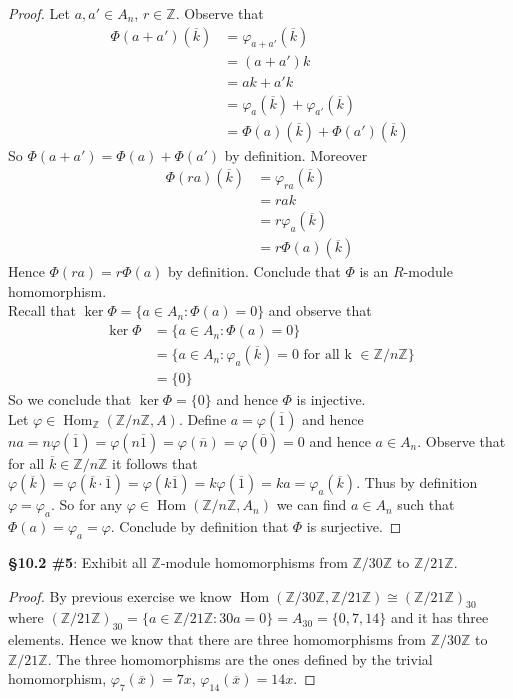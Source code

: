 \documentclass[8pt]{amsart}
\theoremstyle{plain}%
\theoremstyle{definition}
\theoremstyle{remark}
\numberwithin{equation}{section}
\newcommand{\Z}{\mathbb{Z}}
\begin{document}
\begin{proof}
		Let $a, a' \in A_n$, $r \in \Z$. Observe that
		\begin{align*}
			\Phi(a + a')(\overline k)&= \varphi_{a + a'}(\overline k)\\
			&= (a + a')k\\
			&= ak + a'k\\
			&= \varphi_a(\overline k) + \varphi_{a'}(\overline k)\\
			&= \Phi(a)(\overline k) + \Phi(a')(\overline k)
		\end{align*}
		So $\Phi(a + a') = \Phi(a) + \Phi(a')$ by definition. Moreover
		\begin{align*}
			\Phi(ra)(\overline k) &= \varphi_{ra}(\overline k)\\
			&= rak\\
			&= r\varphi_{a}(\overline k)\\
			&= r\Phi(a)(\overline k)
		\end{align*}
		Hence $\Phi(ra) = r\Phi(a)$ by definition. Conclude that $\Phi$ is an $R$-module homomorphism.\\

		Recall that $\ker \Phi = \{a \in A_n : \Phi(a) = 0\}$ and observe that
		\begin{align*}
			\ker \Phi &= \{a \in A_n : \Phi(a) = 0\}\\
			&= \{a \in A_n : \varphi_a(\overline k) = 0 \text{ for all k } \in \Z/n\Z\}\\
			&= \{0\}
		\end{align*}
		So we conclude that $\ker \Phi = \{0\}$ and hence $\Phi$ is injective.\\

		Let $\varphi \in \operatorname{Hom}_\Z(\Z/n\Z, A)$. Define $a = \varphi(\overline 1)$ and hence $na = n\varphi(\overline 1) = \varphi(n \overline 1) = \varphi(\overline n) = \varphi(\overline 0) = 0$ and hence $a \in A_n$. Observe that for all $\overline k \in \Z/n\Z$ it follows that $\varphi(\overline k) = \varphi(\overline k \cdot \overline 1) = \varphi(k \overline 1) = k \varphi(\overline 1) = ka = \varphi_a(\overline k)$. Thus by definition $\varphi = \varphi_a$. So for any $\varphi \in \operatorname{Hom}(\Z/n\Z, A_n)$ we can find $a \in A_n$ such that $\Phi(a) = \varphi_a = \varphi$. Conclude by definition that $\Phi$ is surjective.
	\end{proof}


\textbf{\S 10.2 \#5}: Exhibit all $\Z$-module homomorphisms from $\Z/30\Z$ to $\Z/21\Z$.
	\begin{proof}
	By previous exercise we know $\operatorname{Hom}(\Z/30\Z, \Z/21\Z) \cong (\Z/21\Z)_{30}$ where $(\Z/21\Z)_{30} = \{a \in \Z/21\Z : 30a = 0\} = A_{30}  = \{0, 7, 14\}$ and it has three elements. Hence we know that there are three homomorphisms from $\Z/30\Z$ to $\Z/21\Z$. The three homomorphisms are the ones defined by the trivial homomorphism, $\varphi_7(\overline x) = 7x$, $\varphi_{14}(\overline x) = 14x$.
	\end{proof}
\end{document}
